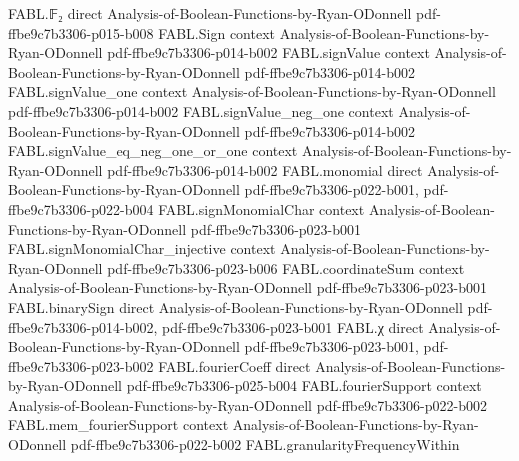 \begin{theorem}
\label{FABL.tendsto_fourierWeightAtLevel_one_hammingUpperTailIndicator}
\leanok
{}
\proofstep
  {FABL.𝔽₂}
  {direct}
  {Analysis-of-Boolean-Functions-by-Ryan-ODonnell}
  {pdf-ffbe9c7b3306-p015-b008}
\proofstep
  {FABL.Sign}
  {context}
  {Analysis-of-Boolean-Functions-by-Ryan-ODonnell}
  {pdf-ffbe9c7b3306-p014-b002}
\proofstep
  {FABL.signValue}
  {context}
  {Analysis-of-Boolean-Functions-by-Ryan-ODonnell}
  {pdf-ffbe9c7b3306-p014-b002}
\proofstep
  {FABL.signValue_one}
  {context}
  {Analysis-of-Boolean-Functions-by-Ryan-ODonnell}
  {pdf-ffbe9c7b3306-p014-b002}
\proofstep
  {FABL.signValue_neg_one}
  {context}
  {Analysis-of-Boolean-Functions-by-Ryan-ODonnell}
  {pdf-ffbe9c7b3306-p014-b002}
\proofstep
  {FABL.signValue_eq_neg_one_or_one}
  {context}
  {Analysis-of-Boolean-Functions-by-Ryan-ODonnell}
  {pdf-ffbe9c7b3306-p014-b002}
\proofstep
  {FABL.monomial}
  {direct}
  {Analysis-of-Boolean-Functions-by-Ryan-ODonnell}
  {pdf-ffbe9c7b3306-p022-b001,
    pdf-ffbe9c7b3306-p022-b004}
\proofstep
  {FABL.signMonomialChar}
  {context}
  {Analysis-of-Boolean-Functions-by-Ryan-ODonnell}
  {pdf-ffbe9c7b3306-p023-b001}
\proofstep
  {FABL.signMonomialChar_injective}
  {context}
  {Analysis-of-Boolean-Functions-by-Ryan-ODonnell}
  {pdf-ffbe9c7b3306-p023-b006}
\proofstep
  {FABL.coordinateSum}
  {context}
  {Analysis-of-Boolean-Functions-by-Ryan-ODonnell}
  {pdf-ffbe9c7b3306-p023-b001}
\proofstep
  {FABL.binarySign}
  {direct}
  {Analysis-of-Boolean-Functions-by-Ryan-ODonnell}
  {pdf-ffbe9c7b3306-p014-b002,
    pdf-ffbe9c7b3306-p023-b001}
\proofstep
  {FABL.χ}
  {direct}
  {Analysis-of-Boolean-Functions-by-Ryan-ODonnell}
  {pdf-ffbe9c7b3306-p023-b001,
    pdf-ffbe9c7b3306-p023-b002}
\proofstep
  {FABL.fourierCoeff}
  {direct}
  {Analysis-of-Boolean-Functions-by-Ryan-ODonnell}
  {pdf-ffbe9c7b3306-p025-b004}
\proofstep
  {FABL.fourierSupport}
  {context}
  {Analysis-of-Boolean-Functions-by-Ryan-ODonnell}
  {pdf-ffbe9c7b3306-p022-b002}
\proofstep
  {FABL.mem_fourierSupport}
  {context}
  {Analysis-of-Boolean-Functions-by-Ryan-ODonnell}
  {pdf-ffbe9c7b3306-p022-b002}
\proofstep
  {FABL.granularityFrequencyWithin}

\end{theorem}
